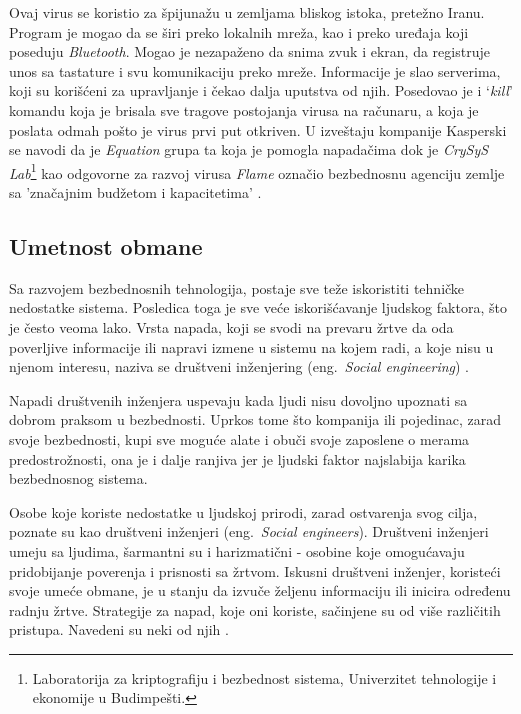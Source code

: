 \documentclass[a4paper]{article}
\begin{document}
Ovaj virus se koristio za špijunažu u zemljama bliskog istoka, pretežno Iranu. Program je mogao da se širi preko lokalnih mreža, kao i preko uređaja koji poseduju {\em Bluetooth}. Mogao je nezapaženo da snima zvuk i ekran, da registruje unos sa tastature i svu komunikaciju preko mreže. Informacije je slao serverima, koji su korišćeni za upravljanje i čekao dalja uputstva od njih. Posedovao je i ‘\textit{kill}’ komandu koja je brisala sve tragove postojanja virusa na računaru, a koja je poslata odmah pošto je virus prvi put otkriven. U izveštaju kompanije Kasperski se navodi da je \textit{Equation} grupa ta koja je pomogla napadačima dok je \textit{CrySyS Lab}\footnote{ Laboratorija za kriptografiju i bezbednost sistema, Univerzitet tehnologije i ekonomije u Budimpešti.} kao odgovorne za razvoj virusa \textit{Flame} označio bezbednosnu agenciju zemlje sa 'značajnim budžetom i kapacitetima' \cite{flame}.

\subsection{Umetnost obmane}
\label{deception}

Sa razvojem bezbednosnih tehnologija, postaje sve teže iskoristiti tehničke nedostatke sistema. Posledica toga je sve veće iskorišćavanje ljudskog faktora, što je često veoma lako. Vrsta napada, koji se svodi na prevaru žrtve da oda poverljive informacije ili napravi izmene u sistemu na kojem radi, a koje nisu u njenom interesu, naziva se društveni inženjering (eng.~{\em Social engineering}) \cite{deception}.

Napadi društvenih inženjera uspevaju kada ljudi nisu dovoljno upoznati sa dobrom praksom u bezbednosti. Uprkos tome što kompanija ili pojedinac, zarad svoje bezbednosti, kupi sve moguće alate i obuči svoje zaposlene o merama predostrožnosti, ona je i dalje ranjiva jer je ljudski faktor najslabija karika bezbednosnog sistema.

Osobe koje koriste nedostatke u ljudskoj prirodi, zarad ostvarenja svog cilja, poznate su kao društveni inženjeri (eng.~{\em Social engineers}). Društveni inženjeri umeju sa ljudima, šarmantni su i harizmatični - osobine koje omogućavaju pridobijanje poverenja i prisnosti sa žrtvom. Iskusni društveni inženjer, koristeći svoje umeće obmane, je u stanju da izvuče željenu informaciju ili inicira određenu radnju žrtve. Strategije za napad, koje oni koriste, sačinjene su od više različitih pristupa. Navedeni su neki od njih \cite{deception}.
\end{document}
